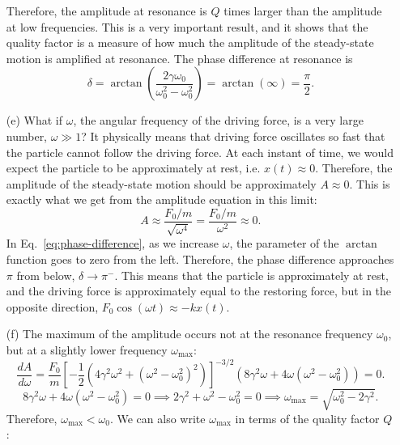 \documentclass[12pt]{article}
\begin{document}
\begin{enumerate}
\begin{equation}
    \end{equation}
    Therefore, the amplitude at resonance is $Q$ times larger than the amplitude at low frequencies. This is a very important result, and it shows that the quality factor is a measure of how much the amplitude of the steady-state motion is amplified at resonance.
    The phase difference at resonance is
    \begin{equation}
        \delta=\arctan\left(\frac{2\gamma\omega_0}{\omega_0^2-\omega_0^2}\right)=\arctan(\infty)=\frac{\pi}{2}.
    \end{equation}
    \item[(e)] What if $\omega$, the angular frequency of the driving force, is a very large number, $\omega \gg 1$? It physically means that driving force oscillates so fast that the particle cannot follow the driving force. At each instant of time, we would expect the particle to be approximately at rest, i.e. $x(t)\approx 0$. Therefore, the amplitude of the steady-state motion should be approximately $A\approx 0$. This is exactly what we get from the amplitude equation in this limit:
    \begin{equation}
        A\approx\frac{F_0/m}{\sqrt{\omega^4}}=\frac{F_0/m}{\omega^2}\approx 0.
    \end{equation}
    In Eq.~\ref{eq:phase-difference}, as we increase $\omega$, the parameter of the $\arctan$ function goes to zero from the left. Therefore, the phase difference approaches $\pi$ from below, $\delta\to\pi^-$. This means that the particle is approximately at rest, and the driving force is approximately equal to the restoring force, but in the opposite direction, $F_0\cos(\omega t)\approx -kx(t)$.
    \item[(f)] The maximum of the amplitude occurs not at the resonance frequency $\omega_0$, but at a slightly lower frequency $\omega_\text{max}$:
    \begin{equation}
    \frac{dA}{d\omega}=\frac{F_0}{m}\left[-\frac{1}{2}\left(4\gamma^2\omega^2+(\omega^2-\omega_0^2)^2\right)\right]^{-3/2}\left(8\gamma^2\omega+4\omega(\omega^2-\omega_0^2)\right)=0.
    \end{equation}
    \begin{equation}
        8\gamma^2\omega+4\omega(\omega^2-\omega_0^2)=0 \implies 2\gamma^2+\omega^2-\omega_0^2=0 \implies \omega_\text{max}=\sqrt{\omega_0^2-2\gamma^2}.
    \end{equation}
    Therefore, $\omega_\text{max}<\omega_0$. We can also write $\omega_\text{max}$ in terms of the quality factor $Q$:

\end{enumerate}
\end{document}
